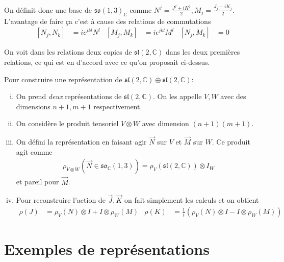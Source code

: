 \documentclass[10pt]{report}
\begin{document}
On d\'efinit donc une base de $\mathfrak{so}(1,3)_{\mathbb{C}}$ comme $N^j = \frac{J^j + iK^j}{2}, M_j = \frac{J_j - iK_j}{2}$. L'avantage de faire \c{c}a c'est \`a cause des relations de commutations
\begin{align}
    \left[ N_j, N_k \right] &= i\epsilon^{jkl}N^l & \left[ M_j, M_k \right] &= i\epsilon^{jkl}M^l & \left[ N_j, M_k \right] &= 0
\end{align}

On voit dans les relations deux copies de $\mathfrak{sl}(2,\mathbb{C})$ dans les deux premi\`eres relations, ce qui est en d'accord avec ce qu'on proposait ci-dessus. 

Pour construire une repr\'esentation de $\mathfrak{sl}(2,\mathbb{C}) \oplus \mathfrak{sl}(2,\mathbb{C})$:
\begin{enumerate}[(i)]
    \item On prend \emph{deux} repr\'esentations de $\mathfrak{sl}(2,\mathbb{C})$. On les appelle $V,W$ avec des dimensions $n+1, m+1$ respectivement.

    \item On consid\`ere le produit tensoriel $V \otimes W$ avec dimension $(n+1)(m+1)$.

    \item On d\'efini la repr\'esentation en faisant agir $\vec{N}$ sur $V$ et $\vec{M}$ sur $W$. Ce produit agit comme
        \begin{align}
            \rho_{V \otimes W}\left( \vec{N} \in \mathfrak{so}_{\mathbb{C}}(1,3) \right) = \rho_V(\mathfrak{sl}(2,\mathbb{C})) \otimes I_W
        \end{align}
        et pareil pour $\vec{M}$. 

    \item Pour reconstruire l'action de $\vec{J}, \vec{K}$ on fait simplement les calculs et on obtient
        \begin{align}
            \rho(J) &= \rho_V(N)\otimes I + I \otimes \rho_W(M) &
            \rho(K) &= \frac{1}{i}\left(\rho_V(N)\otimes I - I \otimes \rho_W(M)\right)\label{14.10.truc}
        \end{align}
\end{enumerate}

\section{Exemples de repr\'esentations}
\end{document}
